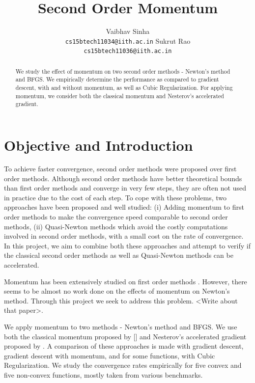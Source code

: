 \documentclass{article}
\title{Second Order Momentum}
\author{
  Vaibhav Sinha \\
  \texttt{cs15btech11034@iith.ac.in}
  \And
  Sukrut Rao \\
  \texttt{cs15btech11036@iith.ac.in}
}
\begin{document}
\maketitle

\begin{abstract}
  We study the effect of momentum on two second order methods - Newton's method and BFGS. We empirically determine the performance as compared to gradient descent, with and without momentum, as well as Cubic Regularization. For applying momentum, we consider both the classical momentum and Nesterov's accelerated gradient.
\end{abstract}

\section{Objective and Introduction}\label{introduction}

To achieve faster convergence, second order methods were proposed over first order methods. Although second order methods have better theoretical bounds than first order methods and converge in very few steps, they are often not used in practice due to the cost of each step. To cope with these problems, two approaches have been proposed and well studied: (i) Adding momentum \cite{POLYAK19641,Sutskever} to first order methods to make the convergence speed comparable to second order methods, (ii) Quasi-Newton methods \citep{davidon,broyden1965class,nocedal1980updating} which avoid the costly computations involved in second order methods, with a small cost on the rate of convergence. In this project, we aim to combine both these approaches and attempt to verify if the classical second order methods as well as Quasi-Newton methods can be accelerated.

Momentum has been extensively studied on first order methods \citep{POLYAK19641,Sutskever}. However, there seems to be almost no work done on the effects of momentum on Newton’s method. Through this project we seek to address this problem. <Write about that paper>.

We apply momentum to two methods - Newton's method and BFGS. We use both the classical momentum proposed by [] and Nesterov's accelerated gradient proposed by \citet{Sutskever}. A comparison of these approaches is made with gradient descent, gradient descent with momentum, and for some functions, with Cubic Regularization. We study the convergence rates empirically for five convex and five non-convex functions, mostly taken from various benchmarks.
\end{document}
